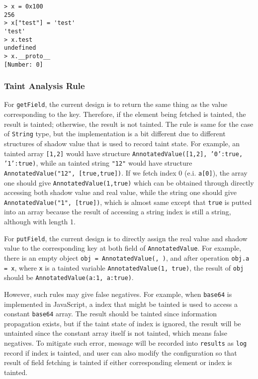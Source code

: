 {\begin{verbatim}
> x = 0x100
256
> x["test"] = 'test'
'test'
> x.test
undefined
> x.__proto__
[Number: 0]
\end{verbatim}

\subsubsection{Taint Analysis Rule}

For \texttt{getField}, the current design is to return the same thing as the value corresponding to the key. Therefore, if the element being fetched is tainted, the result is tainted; otherwise, the result is not tainted. The rule is same for the case of \texttt{String} type, but the implementation is a bit different due to different structures of shadow value that is used to record taint state. For example, an tainted array \texttt{[1,2]} would have structure \texttt{AnnotatedValue([1,2], {'0':true, '1':true})}, while an tainted string \texttt{"12"} would have structure \texttt{AnnotatedValue("12", [true,true])}. If we fetch index 0 (e.i. \texttt{a[0]}), the array one should give \texttt{AnnotatedValue(1,true)} which can be obtained through directly accessing both shadow value and real value, while the string one should give \texttt{AnnotatedValue("1", [true])}, which is almost same except that \texttt{true} is putted into an array because the result of accessing a string index is still a string, although with length 1.

For \texttt{putField}, the current design is to directly assign the real value and shadow value to the corresponding key at both field of \texttt{AnnotatedValue}. For example, there is an empty object \texttt{obj = AnnotatedValue({}, {})}, and after operation \texttt{obj.a = x}, where \texttt{x} is a tainted variable \texttt{AnnotatedValue(1, true)}, the result of \texttt{obj} should be \texttt{AnnotatedValue({a:1}, {a:true})}. 

However, such rules may give false negatives. For example, when \texttt{base64} is implemented in JavaScript, a index that might be tainted is used to access a constant \texttt{base64} array. The result should be tainted since information propagation exists, but if the taint state of index is ignored, the result will be untainted since the constant array itself is not tainted, which means false negatives. To mitigate such error, message will be recorded into \texttt{results} as \texttt{log} record if index is tainted, and user can also modify the configuration so that result of field fetching is tainted if either corresponding element or index is tainted.

}
